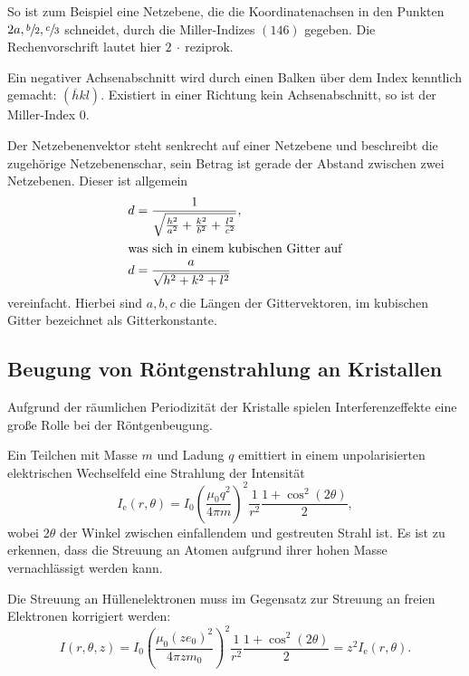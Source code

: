 So ist zum Beispiel eine Netzebene, die die Koordinatenachsen in den
Punkten $2a, \sfrac{b}{2}, \sfrac{c}{3}$ schneidet,
durch die Miller-Indizes $(146)$ gegeben.
Die Rechenvorschrift lautet hier $2~\cdot~\text{reziprok}$.

Ein negativer Achsenabschnitt wird durch einen Balken über dem Index
kenntlich gemacht: $\left(\overline{h}kl\right)$.
Existiert in einer Richtung kein Achsenabschnitt, so ist der Miller-Index 0.

Der Netzebenenvektor steht senkrecht auf einer Netzebene und beschreibt
die zugehörige Netzebenenschar, sein Betrag ist gerade der Abstand zwischen zwei Netzebenen.
Dieser ist allgemein
\begin{align}
  \label{eq:netzebenensbstand}
  d &= \frac{1}{\sqrt{%
    \frac{h^2}{a^2} + \frac{k^2}{b^2} + \frac{l^2}{c^2}
  }}, \\
  \intertext{was sich in einem kubischen Gitter auf}
  d &= \frac{a}{\sqrt{%
    h^2 + k^2 + l^2
  }}
\end{align}
vereinfacht.
Hierbei sind $a, b, c$ die Längen der Gittervektoren,
im kubischen Gitter bezeichnet als Gitterkonstante.

\subsection{Beugung von Röntgenstrahlung an Kristallen}
Aufgrund der räumlichen Periodizität der Kristalle spielen
Interferenzeffekte eine große Rolle bei der Röntgenbeugung.

Ein Teilchen mit Masse $m$ und Ladung $q$ emittiert in einem
unpolarisierten elektrischen Wechselfeld eine Strahlung der Intensität
\begin{equation}
  \label{eq:strahlung_elektron}
  I_\text{e} (r, \theta) = I_0 {\left(\frac{\mu_0 q^2}{4\pi m}\right)}^2 \frac{1}{r^2} \frac{1+ \cos^2\! (2\theta)}{2},
\end{equation}
wobei $2\theta$ der Winkel zwischen einfallendem und gestreuten Strahl ist.
Es ist zu erkennen, dass die Streuung an Atomen aufgrund ihrer hohen Masse
vernachlässigt werden kann.

Die Streuung an Hüllenelektronen muss im Gegensatz zur Streuung an freien
Elektronen korrigiert werden:
\begin{equation}
  \label{eq:strahlung_huellenelektron}
  I (r, \theta, z) = I_0 {\left(\frac{\mu_0 {\left(z e_0 \right)}^2}{4\pi z m_0}\right)}^2 \frac{1}{r^2} \frac{1+\cos^2\! (2\theta)}{2}
  = z^2 I_\text{e} (r, \theta).
\end{equation}

